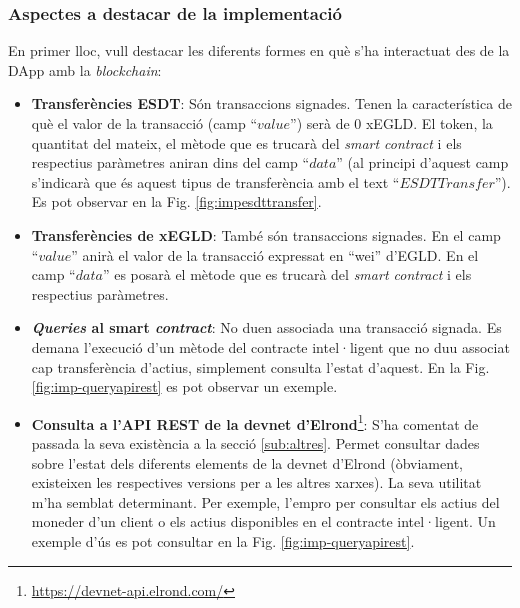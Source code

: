 \documentclass[11pt,a4paper]{article}
\begin{document}
\subsubsection{Aspectes a destacar de la implementació}\label{imp:aspectes}
En primer lloc, vull destacar les diferents formes en què s'ha interactuat des de la DApp amb la \textit{blockchain}:
\begin{itemize}
\item \textbf{Transferències ESDT}: Són transaccions signades. Tenen la característica de què el valor de la transacció (camp ``\(value\)'') serà de 0 xEGLD. El token, la quantitat del mateix, el mètode que es trucarà del \textit{smart contract} i els respectius paràmetres aniran dins del camp ``\(data\)'' (al principi d'aquest camp s'indicarà que és aquest tipus de transferència amb el text ``\(ESDTTransfer\)''). Es pot observar en la Fig. \ref{fig:impesdttransfer}.
\item \textbf{Transferències de xEGLD}: També són transaccions signades. En el camp ``\(value\)'' anirà el valor de la transacció expressat en ``wei'' d'EGLD. En el camp ``\(data\)'' es posarà el mètode que es trucarà del \textit{smart contract} i els respectius paràmetres.
\item \textbf{\textit{Queries} al smart \textit{contract}}: No duen associada una transacció signada. Es demana l'execució d'un mètode del contracte intel·ligent que no duu associat cap transferència d'actius, simplement consulta l'estat d'aquest. En la Fig. \ref{fig:imp-queryapirest} es pot observar un exemple.
\item \textbf{Consulta a l'API REST de la devnet d'Elrond}\footnote{\url{https://devnet-api.elrond.com/}}: S'ha comentat de passada la seva existència a la secció \ref{sub:altres}. Permet consultar dades sobre l'estat dels diferents elements de la devnet d'Elrond (òbviament, existeixen les respectives versions per a les altres xarxes). La seva utilitat m'ha semblat determinant. Per exemple, l'empro per consultar els actius del moneder d'un client o els actius disponibles en el contracte intel·ligent. Un exemple d'ús es pot consultar en la Fig. \ref{fig:imp-queryapirest}. 
\end{itemize}
\end{document}
